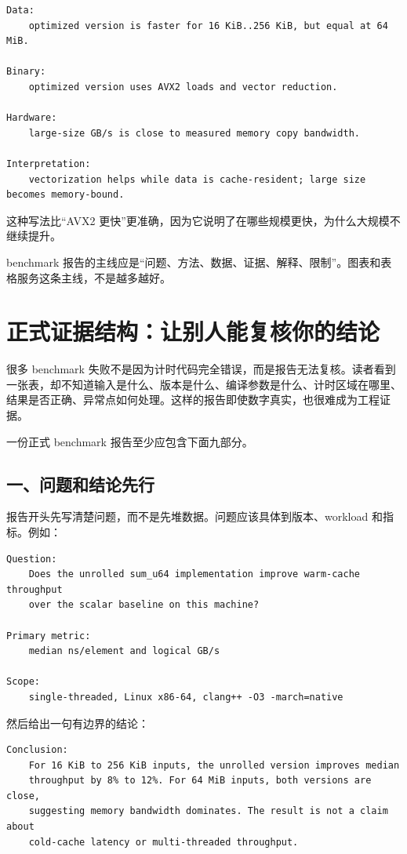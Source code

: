 \begin{lstlisting}
Data:
    optimized version is faster for 16 KiB..256 KiB, but equal at 64 MiB.

Binary:
    optimized version uses AVX2 loads and vector reduction.

Hardware:
    large-size GB/s is close to measured memory copy bandwidth.

Interpretation:
    vectorization helps while data is cache-resident; large size becomes memory-bound.
\end{lstlisting}

这种写法比“AVX2 更快”更准确，因为它说明了在哪些规模更快，为什么大规模不继续提升。

\begin{keyidea}
benchmark 报告的主线应是“问题、方法、数据、证据、解释、限制”。图表和表格服务这条主线，不是越多越好。
\end{keyidea}

\section{正式证据结构：让别人能复核你的结论}

很多 benchmark 失败不是因为计时代码完全错误，而是报告无法复核。读者看到一张表，却不知道输入是什么、版本是什么、编译参数是什么、计时区域在哪里、结果是否正确、异常点如何处理。这样的报告即使数字真实，也很难成为工程证据。

一份正式 benchmark 报告至少应包含下面九部分。

\subsection{一、问题和结论先行}

报告开头先写清楚问题，而不是先堆数据。问题应该具体到版本、workload 和指标。例如：

\begin{lstlisting}
Question:
    Does the unrolled sum_u64 implementation improve warm-cache throughput
    over the scalar baseline on this machine?

Primary metric:
    median ns/element and logical GB/s

Scope:
    single-threaded, Linux x86-64, clang++ -O3 -march=native
\end{lstlisting}

然后给出一句有边界的结论：

\begin{lstlisting}
Conclusion:
    For 16 KiB to 256 KiB inputs, the unrolled version improves median
    throughput by 8% to 12%. For 64 MiB inputs, both versions are close,
    suggesting memory bandwidth dominates. The result is not a claim about
    cold-cache latency or multi-threaded throughput.
\end{lstlisting}

